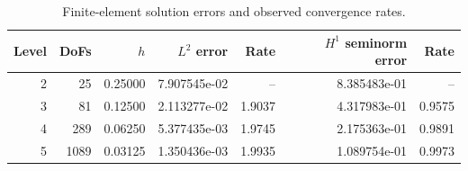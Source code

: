 \begin{table}[htbp]
\centering
\caption{Finite-element solution errors and observed convergence rates.}
\label{tab:solution-convergence}
\begin{tabular}{rrrrrrr}
\hline
Level & DoFs & $h$ & $L^2$ error & Rate & $H^1$ seminorm error & Rate \\
\hline
2 & 25 & 0.25000 & 7.907545e-02 & – & 8.385483e-01 & – \\
3 & 81 & 0.12500 & 2.113277e-02 & 1.9037 & 4.317983e-01 & 0.9575 \\
4 & 289 & 0.06250 & 5.377435e-03 & 1.9745 & 2.175363e-01 & 0.9891 \\
5 & 1089 & 0.03125 & 1.350436e-03 & 1.9935 & 1.089754e-01 & 0.9973 \\
\hline
\end{tabular}
\end{table}